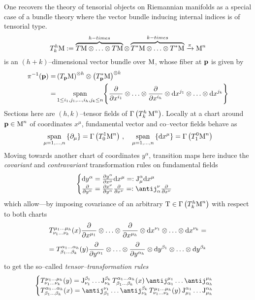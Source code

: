 One recovers the theory of tensorial objects on Riemannian manifolds as a special case of a bundle theory where the vector bundle inducing internal indices is of tensorial type.
$$T^h_k\text{\normalfont M}:=\overbrace{T\text{\normalfont M}\otimes\hdots\otimes T\text{\normalfont M}}^{h-times}\otimes\overbrace{T^*\text{\normalfont M}\otimes\hdots\otimes T^*\text{\normalfont M}}^{k-times}\xrightarrow{\pi}\text{\normalfont M}^n$$
is an $(h+k)$--dimensional vector bundle over $\text{\normalfont M}$, whose fiber at $\mathbf{p}$ is given by
\begin{align*}
    \pi^{-1}(\mathbf{p})=& \left(T_{\mathbf{p}}\text{\normalfont M}\right)^{\otimes h}\otimes\left(T^*_{\mathbf{p}}\text{\normalfont M}\right)^{\otimes k}\\
    =&\mathop{\operatorname{span}}_{1\leq i_1,j_1,\hdots,i_h,j_k\leq n}\Biggl\{\frac{\partial}{\partial x^{i_1}}\otimes\hdots\otimes\frac{\partial}{\partial x^{i_h}}\otimes\text{\normalfont d} x^{j_1}\otimes\hdots\otimes\text{\normalfont d} x^{j_k}\Biggl\}
\end{align*}
Sections here are $(h,k)$--tensor fields of $\Gamma\left(T^h_k\,\text{\normalfont M}^n\right)$. Locally at a chart around $\mathbf{p}\in\text{\normalfont M}^n$ of coordinates $x^\mu$, fundamental vector and co--vector fields behave as
$$\mathop{\operatorname{span}}_{\mu=1,\hdots,n}\left\{\partial_\mu\right\}=\Gamma\left(T^1_0\text{\normalfont M}^n\right)\,,\quad\mathop{\operatorname{span}}_{\mu=1,\hdots,n}\left\{\text{\normalfont d} x^\mu\right\}=\Gamma\left(T^0_1\text{\normalfont M}^n\right)$$
Moving towards another chart of coordinates $y^\alpha$, transition maps here induce the \emph{covariant} and \emph{contravariant} transformation rules on fundamental fields
$$\begin{cases}
    \d y^\alpha=\frac{\der y^\alpha}{\der x^\mu}\d x^\mu=:\J^\alpha_\mu\d x^\mu\\
    \frac{\der}{\der y^\alpha}=\frac{\der x^\nu}{\der y^\alpha}\frac{\der}{\der x^\nu}=:\antij_\alpha^\nu\frac{\der}{\der x^\nu}
\end{cases}$$
which allow---by imposing covariance of an arbitrary $\text{\normalfont T}\in\Gamma\left(T^h_k\text{\normalfont M}^n\right)$ with respect to both charts
$$T^{\mu_1\hdots\mu_h}_{\nu_1\hdots\nu_k}(x)\frac{\partial}{\partial x^{\mu_1}}\otimes\hdots\otimes\frac{\partial}{\partial x^{\mu_h}}\otimes\text{\normalfont d} x^{\nu_1}\otimes\hdots\otimes\text{\normalfont d} x^{\nu_k}=$$
$$=T^{\alpha_1\hdots\alpha_h}_{\beta_1\hdots\beta_k}(y)\frac{\partial}{\partial y^{\alpha_1}}\otimes\hdots\otimes\frac{\partial}{\partial y^{\alpha_h}}\otimes\text{\normalfont d} y^{\beta_1}\otimes\hdots\otimes\text{\normalfont d} y^{\beta_k}$$
to get the so--called \emph{tensor--transformation rules}
$$\begin{cases}
    T^{\mu_1\hdots\mu_h}_{\nu_1\hdots\nu_k}(y)=\J_{\nu_1}^{\beta_1}\hdots\J_{\nu_k}^{\beta_k}\,T^{\alpha_1\hdots\alpha_h}_{\beta_1\hdots\beta_k}(x)\,\antij^{\mu_1}_{\alpha_1}\hdots\antij^{\mu_h}_{\alpha_h}\\
    T^{\alpha_1\hdots\alpha_h}_{\beta_1\hdots\beta_k}(x)=\antij_{\beta_1}^{\nu_1}\hdots\antij^{\beta_k}_{\nu_k}\,T^{\mu_1\hdots\mu_h}_{\nu_1\hdots\nu_k}(y)\,\J^{\alpha_1}_{\mu_1}\hdots\J^{\alpha_h}_{\mu_h}
\end{cases}$$

